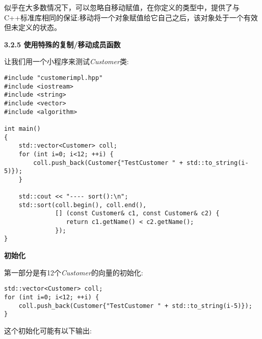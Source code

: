 似乎在大多数情况下，可以忽略自移动赋值，在你定义的类型中，提供了与C++标准库相同的保证:移动将一个对象赋值给它自己之后，该对象处于一个有效但未定义的状态。\par

\hspace*{\fill} \par %
\textbf{3.2.5 使用特殊的复制/移动成员函数}

让我们用一个小程序来测试\textit{Customer}类:\par

{\color{red}{basics/customerimpl.cpp}}

\begin{lstlisting}[caption={}]
#include "customerimpl.hpp"
#include <iostream>
#include <string>
#include <vector>
#include <algorithm>

int main()
{
	std::vector<Customer> coll;
	for (int i=0; i<12; ++i) {
		coll.push_back(Customer{"TestCustomer " + std::to_string(i-5)});
	}

	std::cout << "---- sort():\n";
	std::sort(coll.begin(), coll.end(),
			  [] (const Customer& c1, const Customer& c2) {
			     return c1.getName() < c2.getName();
			  });
}
\end{lstlisting}

\textbf{初始化}

第一部分是有12个\textit{Customer}的向量的初始化:\par

\begin{lstlisting}[caption={}]
std::vector<Customer> coll;
for (int i=0; i<12; ++i) {
	coll.push_back(Customer{"TestCustomer " + std::to_string(i-5)});
}
\end{lstlisting}

这个初始化可能有以下输出:\par

